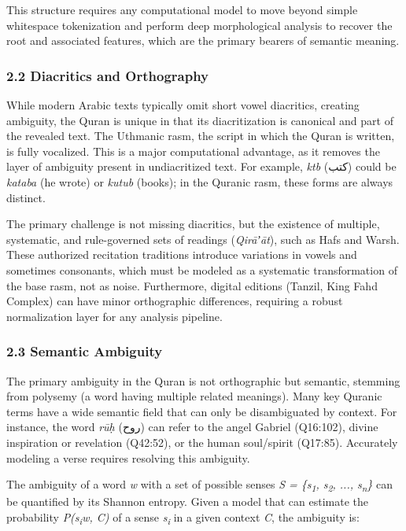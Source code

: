 \documentclass[12pt,a4paper]{article}
\begin{document}
This structure requires any computational model to move beyond simple
whitespace tokenization and perform deep morphological analysis to
recover the root and associated features, which are the primary bearers
of semantic meaning.

\subsubsection{2.2 Diacritics and Orthography}\label{s2-2}

While modern Arabic texts typically omit short vowel diacritics,
creating ambiguity, the Quran is unique in that its diacritization is
canonical and part of the revealed text. The Uthmanic rasm, the script
in which the Quran is written, is fully vocalized. This is a major
computational advantage, as it removes the layer of ambiguity present in
undiacritized text. For example, \emph{ktb} (كتب) could be \emph{kataba}
(he wrote) or \emph{kutub} (books); in the Quranic rasm, these forms are
always distinct.

The primary challenge is not missing diacritics, but the existence of
multiple, systematic, and rule-governed sets of readings
(\emph{Qirāʼāt}), such as Hafs and Warsh. These authorized recitation
traditions introduce variations in vowels and sometimes consonants,
which must be modeled as a systematic transformation of the base rasm,
not as noise. Furthermore, digital editions (Tanzil, King Fahd Complex)
can have minor orthographic differences, requiring a robust
normalization layer for any analysis pipeline.

\subsubsection{2.3 Semantic Ambiguity}\label{s2-3}

The primary ambiguity in the Quran is not orthographic but semantic,
stemming from polysemy (a word having multiple related meanings). Many
key Quranic terms have a wide semantic field that can only be
disambiguated by context. For instance, the word \emph{rūḥ} (روح) can
refer to the angel Gabriel (Q16:102), divine inspiration or revelation
(Q42:52), or the human soul/spirit (Q17:85). Accurately modeling a verse
requires resolving this ambiguity.

The ambiguity of a word \emph{w} with a set of possible senses \emph{S =
\{s\textsubscript{1}, s\textsubscript{2}, ..., s\textsubscript{n}\}} can
be quantified by its Shannon entropy. Given a model that can estimate
the probability \emph{P(s\textsubscript{i}\textbar w, C)} of a sense
\emph{s\textsubscript{i}} in a given context \emph{C}, the ambiguity is:
\end{document}
